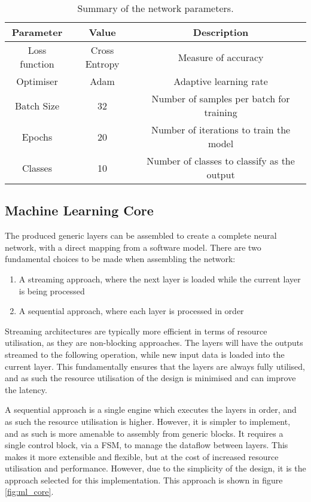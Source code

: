 \begin{table}[h!]
    \centering
    \caption{Summary of the network parameters.}
    \label{tab:network_parameters}
    \begin{tabular}{ccc}
        \toprule
        Parameter & Value & Description \\
        \midrule
        Loss function & Cross Entropy & Measure of accuracy \\
        Optimiser & Adam & Adaptive learning rate \\
        Batch Size & 32 & Number of samples per batch for training \\
        Epochs & 20 & Number of iterations to train the model \\
        Classes & 10 & Number of classes to classify as the output\\
        \bottomrule
    \end{tabular}
\end{table}

\subsection{Machine Learning Core}
The produced generic layers can be assembled to create a complete neural network, with a direct mapping from a software model.
There are two fundamental choices to be made when assembling the network:

\begin{enumerate}
    \item A streaming approach, where the next layer is loaded while the current layer is being processed
    \item A sequential approach, where each layer is processed in order
\end{enumerate}

Streaming architectures are typically more efficient in terms of resource utilisation, as they are non-blocking approaches.
The layers will have the outputs streamed to the following operation, while new input data is loaded into the current layer.
This fundamentally ensures that the layers are always fully utilised, and as such the resource utilisation of the design is minimised and can improve the latency.

A sequential approach is a single engine which executes the layers in order, and as such the resource utilisation is higher.
However, it is simpler to implement, and as such is more amenable to assembly from generic blocks.
It requires a single control block, via a FSM, to manage the dataflow between layers.
This makes it more extensible and flexible, but at the cost of increased resource utilisation and performance.
However, due to the simplicity of the design, it is the approach selected for this implementation.
This approach is shown in figure \ref{fig:ml_core}.

